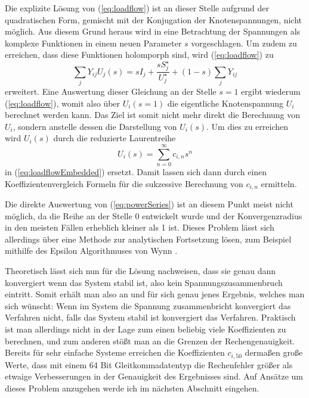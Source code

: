 \documentclass[12pt,a4paper]{article}
\newcommand{\refeq}[1]{{(\ref{#1})}}
\begin{document}
	Die explizite Lösung von \refeq{eq:loadflow} ist an dieser Stelle aufgrund der quadratischen Form, gemischt mit der Konjugation der Knotenspannungen, nicht möglich. Aus diesem Grund heraus wird in \cite{helmPatentSept2009} eine Betrachtung der Spannungen als komplexe Funktionen in einem neuen Parameter $s$ vorgeschlagen. Um zudem zu erreichen, dass diese Funktionen holomporph sind, wird \refeq{eq:loadflow} zu 
	\begin{equation}
		\sum_j Y_{ij} U_{j}(s) = s I_j + \frac{s S_j^\star}{U_j^\star} + (1 - s) \sum_j Y_{ij}
		\label{eq:loadflowEmbedded}
	\end{equation}
	erweitert. Eine Auswertung dieser Gleichung an der Stelle $s = 1$ ergibt wiederum \refeq{eq:loadflow}, womit also über $U_i(s = 1)$ die eigentliche Knotenspannung $U_i$ berechnet werden kann. Das Ziel ist somit nicht mehr direkt die Berechnung von $U_i$, sondern anstelle dessen die Darstellung von $U_i(s)$. Um dies zu erreichen wird $U_i(s)$ durch die reduzierte Laurentreihe 
	\begin{equation}
		U_i(s) = \sum_{n = 0}^\infty c_{i,n} s^n
		\label{eq:powerSeries}
	\end{equation}
	in \refeq{eq:loadflowEmbedded} ersetzt. Damit lassen sich dann durch einen Koeffizientenvergleich Formeln für die sukzessive Berechnung von $c_{i,n}$ ermitteln.
	
	Die direkte Auswertung von \refeq{eq:powerSeries} ist an diesem Punkt meist nicht möglich, da die Reihe an der Stelle 0 entwickelt wurde und der Konvergenzradius in den meisten Fällen erheblich kleiner als 1 ist. Dieses Problem lässt sich allerdings über eine Methode zur analytischen Fortsetzung lösen, zum Beispiel mithilfe des Epsilon Algorithmuses von Wynn \cite{epsilonWynn}.
	
	Theoretisch lässt sich nun für die Lösung nachweisen, dass sie genau dann konvergiert wenn das System stabil ist, also kein Spannungszusammenbruch eintritt. Somit erhält man also an und für sich genau jenes Ergebnis, welches man sich wünscht: Wenn im System die Spannung zusammenbricht konvergiert das Verfahren nicht, falls das System stabil ist konvergiert das Verfahren. Praktisch ist man allerdings nicht in der Lage zum einen beliebig viele Koeffizienten zu berechnen, und zum anderen stößt man an die Grenzen der Rechengenauigkeit. Bereits für sehr einfache Systeme erreichen die Koeffizienten $c_{i,50}$ dermaßen große Werte, dass mit einem 64 Bit Gleitkommadatentyp die Rechenfehler größer als etwaige Verbesserungen in der Genauigkeit des Ergebnisses sind. Auf Ansätze um dieses Problem anzugehen werde ich im nächsten Abschnitt eingehen.
	
\end{document}
